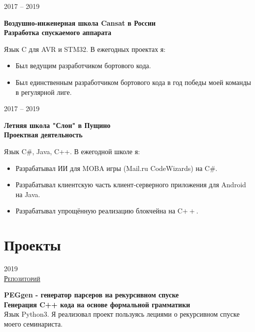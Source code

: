\documentclass{article}
\newcommand{\entry}[3]{
    \begin{minipage}[t]{.11\linewidth}
        \hfill \textsc{#1}
    \end{minipage}
    \hfill\vline\hfill
    \begin{minipage}[t]{.80\linewidth}
        \textbf{#2} \\
        \footnotesize{#3}
    \end{minipage}
}
\begin{document}
        \vspace{.2cm}  
    
        \entry {2017 -- 2019 \\
        }
        {Воздушно-инженерная школа Cansat в России\\
        Разработка спускаемого аппарата}
        {Язык C для AVR и STM32. В ежегодных проектах я:
        \begin{itemize}
            \item Был ведущим разработчиком бортового кода.
            \item Был единственным разработчиком бортового кода в год победы моей команды в регулярной лиге.
        \end{itemize} 
        } 
        
        \vspace{.2cm}
        
        \entry {2017 -- 2019 \\
        }
        {Летняя школа "Слон" в Пущино\\
        Проектная деятельность}
        {Язык C$\boldsymbol{\#}$, Java, C++. В ежегодной школе я:
        \begin{itemize}
            \item Разрабатывал ИИ для MOBA игры (Mail.ru CodeWizards) на C$\boldsymbol{\#}$. 
            \item Разрабатывал клиентскую часть клиент-серверного приложения для Android на Java.
            \item Разрабатывал упрощённую реализацию блокчейна на C$\boldsymbol{++}$.
        \end{itemize} 
        }
        
    \section{Проекты}
        
    \entry {2019 \\
    \href {https://github.com/InversionSpaces/PEGgen} {Репозиторий} }
    {PEGgen - генератор парсеров на рекурсивном спуске \\
    Генерация C++ кода на основе формальной грамматики}
    {Язык Python3. Я реализовал проект пользуясь лециями о рекурсивном спуске моего семинариста.} 
    
    \vspace{.2cm}
    
\end{document}
